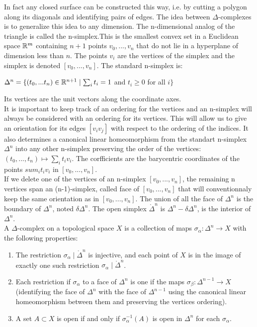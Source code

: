 \documentclass[12pt]{article}
\begin{document}
In fact any closed surface can be constructed this way, i.e. by cutting a polygon along its diagonals and identifying pairs of edges. The idea between $\Delta$-complexes is to generalize this idea to any dimension. The n-dimensional analog of the triangle is called the n-simplex.This is the smallest convex set in a Euclidean space $\mathbb{R}^m$ containing $n + 1$ points $v_0 , ... , v_n$ that do not lie in a hyperplane of dimension less than $n$. The points $v_i$ are the vertices of the simplex and the simplex is denoted $[v_0, ..., v_n]$. The standard n-simplex is:\\

\begin{center}
  $\Delta^n = \{ (t_0,...t_n) \in \mathbb{R}^{n+1} \mid \sum_i t_i  = 1$ and $t_i \ge 0$ for all $i \}$
\end{center}

Its vertices are the unit vectors along the coordinate axes.\\

It is important to keep track of an ordering for the vertices and an n-simplex will always be considered with an ordering for its vertices. This will allow us to give an orientation for its edges $[v_iv_j]$ with respect to the ordering of the indices. It also determines a canonical linear homeomorphism from the standart n-simplex $\Delta^n$ into any other n-simplex preserving the order of the vertices: $(t_0, ..., t_n) \mapsto \sum_i t_i v_i$. The corfficients are the barycentric coordinates of the points $sum_i t_i v_i$ in $[v_0, ..., v_n]$.\\

If we delete one of the vertices of an n-simplex $[v_0, ..., v_n]$, the remaining n vertices span an (n-1)-simplex, called face of $[v_0, ..., v_n]$ that will conventionnaly keep the same orientation as in $[v_0, ..., v_n]$. The union of all the face of $\Delta^n$ is the boundary of $\Delta^n$, noted $\delta \Delta^n$. The open simplex $\mathring{\Delta}^n$ is $\Delta^n - \delta \Delta^n$, is the interior of $\Delta^n$.\\

A $\Delta$-complex on a topological space $X$ is a collection of maps $\sigma_\alpha : \Delta^n \to X$  with the following properties:\\

\begin{enumerate}[label=(\roman*)]
  \item The restriction $\sigma_\alpha \mid \mathring{\Delta}^n$ is injective, and each point of $X$ is in the image of exactly one such restriction $\sigma_\alpha \mid \mathring{\Delta}^n$.
  \item Each restriction if $\sigma_\alpha$ to a face of $\Delta^n$ is one if the maps $\sigma_\beta : \Delta^{n-1} \to X$ (identifying the face of $\Delta^n$ with the face of $\Delta^{n-1}$ using the canonical linear homeomorphism between them and preserving the vertices ordering).
  \item A set $A \subset X$ is open if and only if $\sigma_\alpha^{-1}(A)$ is open in $\Delta^n$ for each $\sigma_\alpha$.
\end{enumerate}
\end{document}
